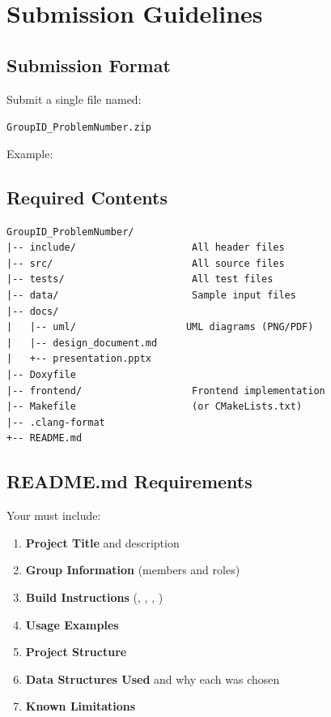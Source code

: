 
\section{Submission Guidelines}

\subsection{Submission Format}

Submit a single  file named:

\begin{center}
\texttt{GroupID\_ProblemNumber.zip}
\end{center}

Example: 

\subsection{Required Contents}

\begin{lstlisting}[style=tree]
GroupID_ProblemNumber/
|-- include/                    All header files
|-- src/                        All source files
|-- tests/                      All test files
|-- data/                       Sample input files
|-- docs/
|   |-- uml/                   UML diagrams (PNG/PDF)
|   |-- design_document.md
|   +-- presentation.pptx
|-- Doxyfile
|-- frontend/                   Frontend implementation
|-- Makefile                    (or CMakeLists.txt)
|-- .clang-format
+-- README.md
\end{lstlisting}

\subsection{README.md Requirements}

Your  must include:

\begin{enumerate}
  \item \textbf{Project Title} and description
  \item \textbf{Group Information} (members and roles)
  \item \textbf{Build Instructions} (\makedeps, \make, \makerun, \maketest)
  \item \textbf{Usage Examples}
  \item \textbf{Project Structure}
  \item \textbf{Data Structures Used} and why each was chosen
  \item \textbf{Known Limitations}
\end{enumerate}

